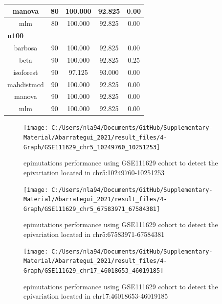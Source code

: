 \documentclass[
]{article}
\begin{document}
\begin{table}
\begin{tabular}[t]{c|c|c|c|c}
\hline
\hspace{1em}manova & 80 & 100.000 & 92.825 & 0.00\\
\hline
\hspace{1em}mlm & 80 & 100.000 & 92.825 & 0.00\\
\hline
\multicolumn{5}{l}{\textbf{n100}}\\
\hline
\hspace{1em}barbosa & 90 & 100.000 & 92.825 & 0.00\\
\hline
\hspace{1em}beta & 90 & 100.000 & 92.825 & 0.25\\
\hline
\hspace{1em}isoforest & 90 & 97.125 & 93.000 & 0.00\\
\hline
\hspace{1em}mahdistmcd & 90 & 100.000 & 92.825 & 0.00\\
\hline
\hspace{1em}manova & 90 & 100.000 & 92.825 & 0.00\\
\hline
\hspace{1em}mlm & 90 & 100.000 & 92.825 & 0.00\\
\hline
\end{tabular}
\end{table}

\begin{figure}[H]

{\centering \texttt{[image: C:/Users/nla94/Documents/GitHub/Supplementary-Material/Abarrategui\_2021/result\_files/4-Graph/GSE111629\_chr5\_10249760\_10251253]} 

}

\caption{epimutations performance using GSE111629 cohort to detect the epivariation located in chr5:10249760-10251253}\label{fig:graph_GSE111629_1}
\end{figure}

\begin{figure}

{\centering \texttt{[image: C:/Users/nla94/Documents/GitHub/Supplementary-Material/Abarrategui\_2021/result\_files/4-Graph/GSE111629\_chr5\_67583971\_67584381]} 

}

\caption{epimutations performance using GSE111629 cohort to detect the epivariation located in chr5:67583971-67584381}\label{fig:graph_GSE111629_2}
\end{figure}

\begin{figure}

{\centering \texttt{[image: C:/Users/nla94/Documents/GitHub/Supplementary-Material/Abarrategui\_2021/result\_files/4-Graph/GSE111629\_chr17\_46018653\_46019185]} 

}

\caption{epimutations performance using GSE111629 cohort to detect the epivariation located in chr17:46018653-46019185}\label{fig:graph_GSE111629_3}
\end{figure}
\end{document}
